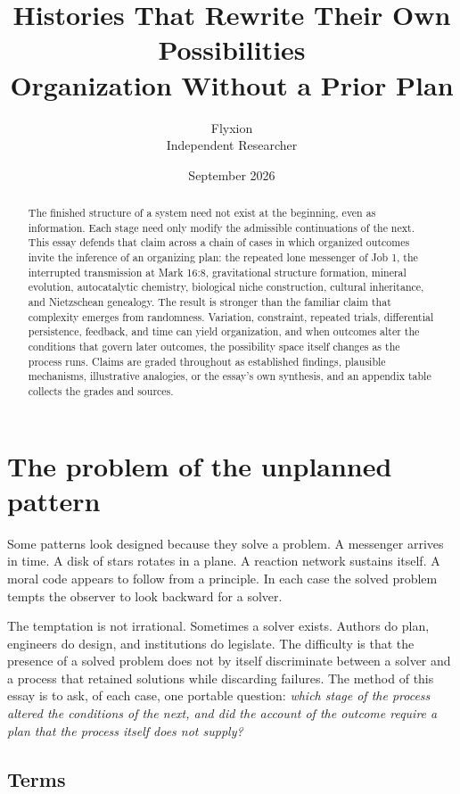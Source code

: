 \documentclass[11pt]{article}
\title{Histories That Rewrite Their Own Possibilities\\[0.4em]
\large Organization Without a Prior Plan}
\author{Flyxion\\Independent Researcher}
\date{September 2026}
\begin{document}
\maketitle

\begin{abstract}
The finished structure of a system need not exist at the beginning, even as information. Each stage need only modify the admissible continuations of the next. This essay defends that claim across a chain of cases in which organized outcomes invite the inference of an organizing plan: the repeated lone messenger of Job 1, the interrupted transmission at Mark 16:8, gravitational structure formation, mineral evolution, autocatalytic chemistry, biological niche construction, cultural inheritance, and Nietzschean genealogy. The result is stronger than the familiar claim that complexity emerges from randomness. Variation, constraint, repeated trials, differential persistence, feedback, and time can yield organization, and when outcomes alter the conditions that govern later outcomes, the possibility space itself changes as the process runs. Claims are graded throughout as established findings, plausible mechanisms, illustrative analogies, or the essay's own synthesis, and an appendix table collects the grades and sources.
\end{abstract}

\section{The problem of the unplanned pattern}

Some patterns look designed because they solve a problem. A messenger arrives in time. A disk of stars rotates in a plane. A reaction network sustains itself. A moral code appears to follow from a principle. In each case the solved problem tempts the observer to look backward for a solver.

The temptation is not irrational. Sometimes a solver exists. Authors do plan, engineers do design, and institutions do legislate. The difficulty is that the presence of a solved problem does not by itself discriminate between a solver and a process that retained solutions while discarding failures. The method of this essay is to ask, of each case, one portable question: \emph{which stage of the process altered the conditions of the next, and did the account of the outcome require a plan that the process itself does not supply?}

\subsection{Terms}
\end{document}
